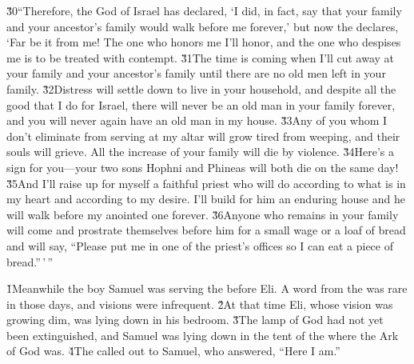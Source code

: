 \v{30}``Therefore, the  God of Israel has declared, `I did, in fact, say that your family and your ancestor's family would walk before me forever,' but now the  declares, `Far be it from me! The one who honors me I'll honor, and the one who despises me is to be treated with contempt. \v{31}The time is coming when I'll cut away at your family and your ancestor's family until there are no old men left in your family. \v{32}Distress will settle down to live in your household, and despite all the good that I do for Israel, there will never be an old man in your family forever, and you will never again have an old man in my house. \v{33}Any of you whom I don't eliminate from serving at my altar will grow tired from weeping, and their souls will grieve. All the increase of your family will die by violence. \v{34}Here's a sign for you---your two sons Hophni and Phineas will both die on the same day! \v{35}And I'll raise up for myself a faithful priest who will do according to what is in my heart and according to my desire. I'll build for him an enduring house and he will walk before my anointed one forever. \v{36}Anyone who remains in your family will come and prostrate themselves before him for a small wage or a loaf of bread and will say, ``Please put me in one of the priest's offices so I can eat a piece of bread.''\,'\,''

\v{1}Meanwhile the boy Samuel was serving the  before Eli. A word from the  was rare in those days, and visions were infrequent. \v{2}At that time Eli, whose vision was growing dim, was lying down in his bedroom. \v{3}The lamp of God had not yet been extinguished, and Samuel was lying down in the tent of the  where the Ark of God was. \v{4}The  called out to Samuel, who answered, ``Here I am.''

